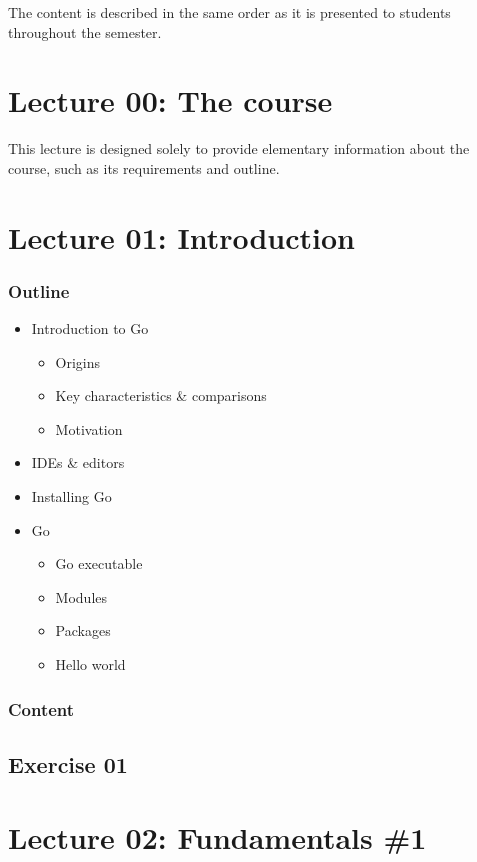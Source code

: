 \documentclass[
  digital,
  color,
  oneside,
  nosansbold,
  nocolorbold,
  lof,
  lot,
]{fithesis4}
\begin{document}
The content is described in the same order as it is presented to students throughout the semester.

\section{Lecture 00: The course}

This lecture is designed solely to provide elementary information about the course, such as its requirements and outline.

\section{Lecture 01: Introduction}

\subsubsection{Outline}

\begin{itemize}
    \item Introduction to Go
    \begin{itemize}
        \item Origins
        \item Key characteristics \& comparisons
        \item Motivation
    \end{itemize}
    \item IDEs \& editors
    \item Installing Go
    \item Go
    \begin{itemize}
        \item Go executable
        \item Modules
        \item Packages
        \item Hello world
    \end{itemize}
\end{itemize}

\subsubsection{Content}

\subsection{Exercise 01}

\section{Lecture 02: Fundamentals \#1}
\end{document}
